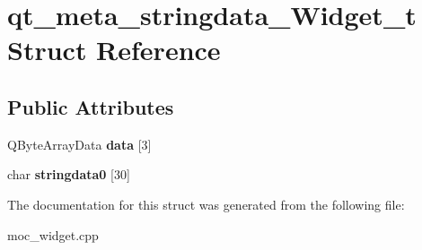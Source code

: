 \hypertarget{structqt__meta__stringdata___widget__t}{}\section{qt\+\_\+meta\+\_\+stringdata\+\_\+\+Widget\+\_\+t Struct Reference}
\label{structqt__meta__stringdata___widget__t}
\subsection*{Public Attributes}
\begin{DoxyCompactItemize}
\item 
\mbox{\label{structqt__meta__stringdata___widget__t_ae21052b7ec9e52d41a6fad5351c87ffc}} 
Q\+Byte\+Array\+Data {\bfseries data} \mbox{[}3\mbox{]}
\item 
\mbox{\label{structqt__meta__stringdata___widget__t_a0437e387657df2b44c556dcd0c296e4b}} 
char {\bfseries stringdata0} \mbox{[}30\mbox{]}
\end{DoxyCompactItemize}


The documentation for this struct was generated from the following file\+:\begin{DoxyCompactItemize}
\item 
moc\+\_\+widget.\+cpp\end{DoxyCompactItemize}
